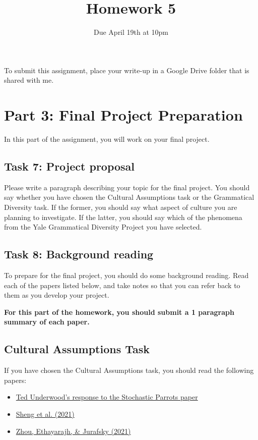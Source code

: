 \documentclass[12pt,table]{article}
\title{Homework 5}
\author{Due April 19th at 10pm}
\date{}
\begin{document}
\maketitle{}

To submit this assignment, place your write-up in a Google Drive folder that is shared with me.

\section*{Part 3: Final Project Preparation}

In this part of the assignment, you will work on your final project.

\subsection*{Task 7: Project proposal}

Please write a paragraph describing your topic for the final project. You should say whether you have chosen the Cultural Assumptions task or the Grammatical Diversity task. If the former, you should say what aspect of culture you are planning to investigate. If the latter, you should say which of the phenomena from the Yale Grammatical Diversity Project you have selected.

\subsection*{Task 8: Background reading}

To prepare for the final project, you should do some background reading.  Read each of the papers listed below, and take notes so that you can refer back to them as you develop your project.

\textbf{For this part of the homework, you should submit a 1 paragraph summary of each paper.}

\subsection*{Cultural Assumptions Task}

If you have chosen the Cultural Assumptions task, you should read the following papers:

\begin{itemize}
\item \href{https://tedunderwood.com/2021/10/21/latent-spaces-of-culture}{Ted Underwood's response to the Stochastic Parrots paper}
\item \href{https://arxiv.org/abs/2105.04054}{Sheng et al. (2021)}
\item \href{https://arxiv.org/abs/2104.08465}{Zhou, Ethayarajh, \& Jurafsky (2021)}
\end{itemize}
\end{document}
